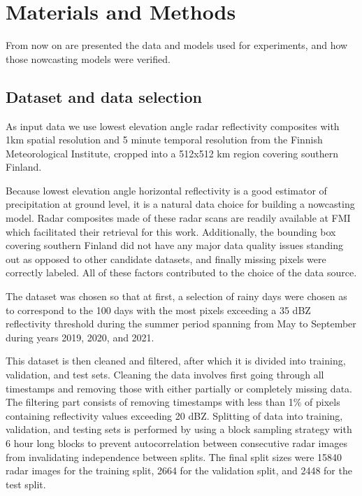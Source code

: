\chapter{Materials and Methods}
\label{chapter:methods}

From now on are presented the data and models used for experiments, and how those nowcasting models were verified. 

\section{Dataset and data selection}
\label{section:data}

As input data we use lowest elevation angle radar reflectivity composites with 1km spatial resolution and 5 minute temporal resolution from the Finnish Meteorological Institute, cropped into a 512x512 km region covering southern Finland. 

Because lowest elevation angle horizontal reflectivity is a good estimator of precipitation at ground level, it is a natural data choice for building a nowcasting model. Radar composites made of these radar scans are readily available at FMI which facilitated their retrieval for this work. Additionally, the bounding box covering southern Finland did not have any major data quality issues standing out as opposed to other candidate datasets, and finally missing pixels were correctly labeled. All of these factors contributed to the choice of the data source. 


The dataset was chosen so that at first, a selection of rainy days were chosen as to correspond to the 100 days with the most pixels exceeding a 35 dBZ reflectivity threshold during the summer period spanning from May to September during years 2019, 2020, and 2021. 

This dataset is then cleaned and filtered, after which it is divided into training, validation, and test sets. Cleaning the data involves first going through all timestamps and removing those with either partially or completely missing data. The filtering part consists of removing timestamps with less than 1\% of pixels containing reflectivity values exceeding 20 dBZ. Splitting of data into training, validation, and testing sets is performed by using a block sampling strategy \cite{schultz_can_2021} with 6 hour long blocks to prevent autocorrelation between consecutive radar images from invalidating independence between splits. The final split sizes were 15840 radar images for the training split, 2664 for the validation split, and 2448 for the test split. 

